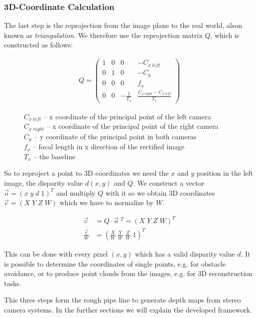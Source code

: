 \documentclass[11pt]{article}
\begin{document}
\subsubsection{3D-Coordinate Calculation}
The last step is the reprojection from the image plane to the real world, alson known as \emph{triangulation}. We therefore use the reprojection matrix $Q$, which is constructed as follows:

\begin{figure}[H]
\centering
\begin{align*}
Q=
\begin{pmatrix}
1 & 0 & 0 & -C_{x\;left} \\
0 & 1 & 0 & -C_{y} \\
0 & 0 & 0 & f_x \\
0 & 0 & -\frac{1}{T_x} & \frac{C_{x\;right}-C_{x\;left}}{T_x}
\end{pmatrix}
\end{align*}
\captionsetup{justification=justified,margin=1cm}
\caption*{
 $C_{x\;left}$ -- x coordinate of the principal point of the left camera\\
 $C_{x\;right}$ -- x coordinate of the principal point of the right camera\\
 $C_{y}$ -- y coordinate of the principal point in both cameras\\
 $f_x$ -- focal length in x direction of the rectified image\\
 $T_x$ -- the baseline}
\end{figure}



So to reproject a point to 3D coordinates we need the $x$ and $y$ position in the left image, the disparity value $d(x,y)$ and $Q$. We construct a vector $\vec{o}=(x\;y\;d\;1)^T$ and multiply $Q$ with it so we obtain 3D coordinates $\vec{c}=(X\;Y\;Z\;W)$ which we have to normalize by $W$.

\begin{align*}
	\vec{c}&=Q\cdot \vec{o}\;^T = (X\;Y\;Z\;W)^T\\
	\frac{\vec{c}}{W}&=\left(\frac{X}{W}\;\frac{Y}{W}\;\frac{Z}{W}\;1\right)^T
\end{align*}

This can be done with every pixel $(x,y)$ which has a valid disparity value $d$. It is possible to determine the coordinates of single points, e.g. for obstacle avoidance, or to produce point clouds from the images, e.g. for 3D reconstruction tasks.


\bigskip This three steps form the rough pipe line to generate depth maps from stereo camera systems. In the further sections we will explain the developed framework.
\end{document}
